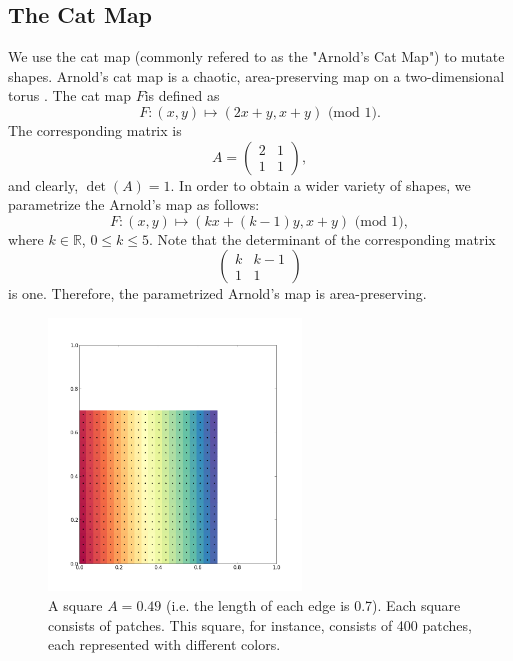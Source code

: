 \documentclass[12pt]{article}
\begin{document}
\subsection{The Cat Map}
We use the cat map (commonly refered to as the "Arnold's Cat Map") to mutate shapes.
Arnold's cat map is a chaotic, area-preserving map on a two-dimensional torus \citep{hilborn}.
The cat map $F$is defined as
\begin{equation*}
  F: (x,y) \mapsto (2x + y, x + y) \mbox{ (mod 1)}.
\end{equation*}
The corresponding matrix is
\begin{equation*}
A =
\begin{pmatrix}
    2 & 1  \\
    1 & 1  
  \end{pmatrix},
\end{equation*}
and clearly, $\det(A) = 1$.
In order to obtain a wider variety of shapes, we parametrize the Arnold's map as follows:
\begin{equation*}
  F: (x,y) \mapsto (kx + (k-1)y, x + y) \mbox{ (mod 1)},
\end{equation*}
where $k \in \mathbb{R}$, $0 \leq k \leq 5$.
Note that the determinant of the corresponding matrix
\begin{equation*}
\begin{pmatrix}
    k & k-1  \\
    1 & 1  
  \end{pmatrix}
\end{equation*}
is one.
Therefore, the parametrized Arnold's map is area-preserving.
\begin{figure}[t]
  \centering
  \includegraphics[width=0.6\textwidth]{square049_400}
  \caption{A square $A = 0.49$ (i.e. the length of each edge is 0.7). Each square consists of patches. This square, for instance, consists of 400 patches, each represented with different colors.}
  \label{fig:square}
\end{figure}
\end{document}
